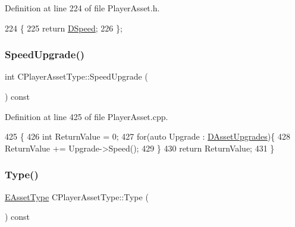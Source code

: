 Definition at line 224 of file Player\+Asset.\+h.


\begin{DoxyCode}
224                          \{
225             \textcolor{keywordflow}{return} \hyperlink{classCPlayerAssetType_a0e72be67119e97fb64a6036cd5da8d1a}{DSpeed};  
226         \};
\end{DoxyCode}
\hypertarget{classCPlayerAssetType_a3c98952e1a08cca0562f80db67451e0e}{}\label{classCPlayerAssetType_a3c98952e1a08cca0562f80db67451e0e} 
\subsubsection{\texorpdfstring{Speed\+Upgrade()}{SpeedUpgrade()}}
{\footnotesize\ttfamily int C\+Player\+Asset\+Type\+::\+Speed\+Upgrade (\begin{DoxyParamCaption}{ }\end{DoxyParamCaption}) const}



Definition at line 425 of file Player\+Asset.\+cpp.


\begin{DoxyCode}
425                                         \{
426     \textcolor{keywordtype}{int} ReturnValue = 0;
427     \textcolor{keywordflow}{for}(\textcolor{keyword}{auto} Upgrade : \hyperlink{classCPlayerAssetType_aeb8d5c3ea81ea56248d02a5e24d48001}{DAssetUpgrades})\{
428         ReturnValue += Upgrade->Speed();
429     \}
430     \textcolor{keywordflow}{return} ReturnValue;
431 \}
\end{DoxyCode}
\hypertarget{classCPlayerAssetType_a09046fe07dd1f9d19c644dba1efac24b}{}\label{classCPlayerAssetType_a09046fe07dd1f9d19c644dba1efac24b} 
\subsubsection{\texorpdfstring{Type()}{Type()}}
{\footnotesize\ttfamily \hyperlink{GameDataTypes_8h_a5600d4fc433b83300308921974477fec}{E\+Asset\+Type} C\+Player\+Asset\+Type\+::\+Type (\begin{DoxyParamCaption}{ }\end{DoxyParamCaption}) const\hspace{0.3cm}{\ttfamily [inline]}}




